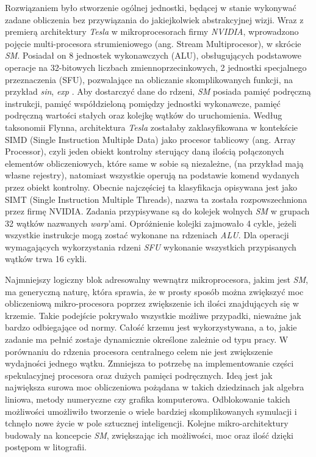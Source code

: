 Rozwiązaniem było stworzenie ogólnej jednostki, będącej w stanie wykonywać zadane obliczenia bez przywiązania do jakiejkolwiek abstrakcyjnej wizji.
Wraz z premierą architektury \textit{Tesla} w mikroprocesorach firmy \textit{NVIDIA}, wprowadzono pojęcie multi-procesora strumieniowego (ang. Stream Multiprocesor), w skrócie \textit{SM}.
Posiadał on 8 jednostek wykonawczych (ALU), obsługujących podstawowe operacje na 32-bitowych liczbach zmiennoprzecinkowych, 2 jednostki specjalnego przeznaczenia (SFU), pozwalające na obliczanie skomplikowanych funkcji, na przykład \textit{sin}, \textit{exp} \cite{TeslaNV}.
Aby dostarczyć dane do rdzeni, \textit{SM} posiada pamięć podręczną instrukcji, pamięć współdzieloną pomiędzy jednostki wykonawcze, pamięć podręczną wartości stałych oraz kolejkę wątków do uruchomienia.
Według taksonomii Flynna, architektura \textit{Tesla} zostałaby zaklasyfikowana w kontekście SIMD (Single Instruction Multiple Data) jako procesor tablicowy (ang. Array Processor)\cite{Flynn72}, czyli jeden obiekt kontrolny sterujący daną ilością połączonych elementów obliczeniowych, które same w sobie są niezależne, (na przykład mają własne rejestry), natomiast wszystkie operują na podstawie komend wydanych przez obiekt kontrolny.
Obecnie najczęściej ta klasyfikacja opisywana jest jako SIMT (Single Instruction Multiple Threads), nazwa ta została rozpowszechniona przez firmę NVIDIA.
Zadania przypisywane są do kolejek wolnych \textit{SM} w grupach 32 wątków nazwanych \textit{warp}'ami.
Opróżnienie kolejki zajmowało 4 cykle, jeżeli wszystkie instrukcje mogą zostać wykonane na rdzeniach \textit{ALU}.
Dla operacji wymagających wykorzystania rdzeni \textit{SFU} wykonanie wszystkich przypisanych wątków trwa 16 cykli.

Najmniejszy logiczny blok adresowalny wewnątrz mikroprocesora, jakim jest \textit{SM}, ma generyczną naturę, która sprawia, że w prosty sposób można zwiększyć moc obliczeniową mikro-procesora poprzez zwiększenie ich ilości znajdujących się w krzemie.
Takie podejście pokrywało wszystkie możliwe przypadki, nieważne jak bardzo odbiegające od normy.
Całość krzemu jest wykorzystywana, a to, jakie zadanie ma pełnić zostaje dynamicznie określone zależnie od typu pracy. 
W porównaniu do rdzenia procesora centralnego celem nie jest zwiększenie wydajności jednego wątku.
Zmniejsza to potrzebę na implementowanie części spekulacyjnej procesora oraz dużych pamięci podręcznych.
Ideą jest jak największa surowa moc obliczeniowa pożądana w takich dziedzinach jak algebra liniowa, metody numeryczne czy grafika komputerowa.
Odblokowanie takich możliwości umożliwiło tworzenie o wiele bardziej skomplikowanych symulacji i tchnęło nowe życie w pole sztucznej inteligencji.
Kolejne mikro-architektury budowały na koncepcie \textit{SM}, zwiększając ich możliwości, moc oraz ilość dzięki postępom w litografii.

